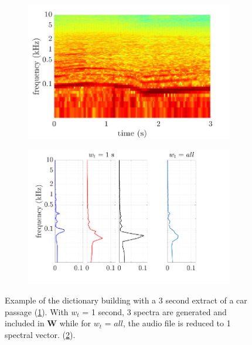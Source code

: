 \documentclass[twocolumn,a4paper,10pt]{article}
\begin{document}
\begin{figure}[t!]
    \centering
    \begin{subfigure}[t]{0.47\linewidth}
        \centering
       \includegraphics[width=\linewidth]{figures/dictionary1.pdf}
       \caption{}
        \label{fig:specW}
    \end{subfigure}%
    \hfill
    \begin{subfigure}[t]{0.47\linewidth}
        \centering
       \includegraphics[width=\linewidth]{figures/dictionary2.pdf}
        \caption{}
        \label{fig:ElementW}
    \end{subfigure}
    \caption{Example of the dictionary building with a 3 second extract of a car passage (\ref{fig:specW}). With $w_t$ = 1 second, 3 spectra are generated and included in $\mathbf{W}$ while for $w_t$ = $all$, the audio file is reduced to 1 spectral vector. (\ref{fig:ElementW}).}
    \label{fig:spec_elementW}
\end{figure}
\end{document}
